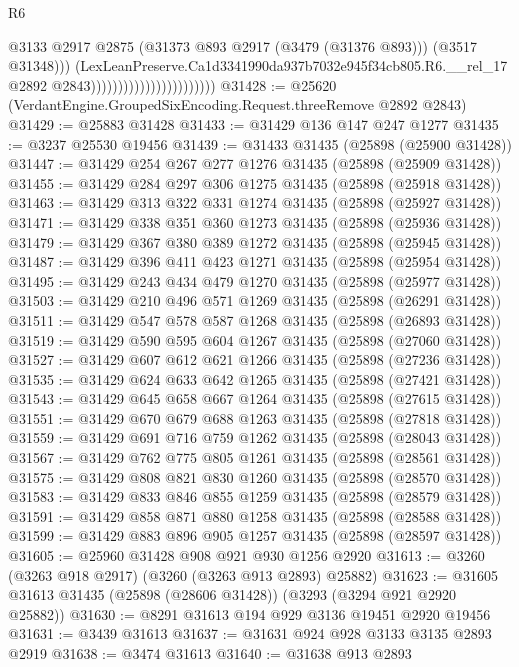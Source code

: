 \begin{lexlean}{R6}
\begin{coremodule}
                                                    @3133
                                                    @2917
                                                    @2875
                                                    (@31373 @893 @2917 (@3479 (@31376 @893)))
                                                    (@3517 @31348)))
                                                (LexLeanPreserve.Ca1d3341990da937b7032e945f34cb805.R6.__rel_17
                                                  @2892
                                                  @2843)))))))))))))))))))))))
@31428 := @25620 (VerdantEngine.GroupedSixEncoding.Request.threeRemove @2892 @2843)
@31429 := @25883 @31428
@31433 := @31429 @136 @147 @247 @1277
@31435 := @3237 @25530 @19456
@31439 := @31433 @31435 (@25898 (@25900 @31428))
@31447 := @31429 @254 @267 @277 @1276 @31435 (@25898 (@25909 @31428))
@31455 := @31429 @284 @297 @306 @1275 @31435 (@25898 (@25918 @31428))
@31463 := @31429 @313 @322 @331 @1274 @31435 (@25898 (@25927 @31428))
@31471 := @31429 @338 @351 @360 @1273 @31435 (@25898 (@25936 @31428))
@31479 := @31429 @367 @380 @389 @1272 @31435 (@25898 (@25945 @31428))
@31487 := @31429 @396 @411 @423 @1271 @31435 (@25898 (@25954 @31428))
@31495 := @31429 @243 @434 @479 @1270 @31435 (@25898 (@25977 @31428))
@31503 := @31429 @210 @496 @571 @1269 @31435 (@25898 (@26291 @31428))
@31511 := @31429 @547 @578 @587 @1268 @31435 (@25898 (@26893 @31428))
@31519 := @31429 @590 @595 @604 @1267 @31435 (@25898 (@27060 @31428))
@31527 := @31429 @607 @612 @621 @1266 @31435 (@25898 (@27236 @31428))
@31535 := @31429 @624 @633 @642 @1265 @31435 (@25898 (@27421 @31428))
@31543 := @31429 @645 @658 @667 @1264 @31435 (@25898 (@27615 @31428))
@31551 := @31429 @670 @679 @688 @1263 @31435 (@25898 (@27818 @31428))
@31559 := @31429 @691 @716 @759 @1262 @31435 (@25898 (@28043 @31428))
@31567 := @31429 @762 @775 @805 @1261 @31435 (@25898 (@28561 @31428))
@31575 := @31429 @808 @821 @830 @1260 @31435 (@25898 (@28570 @31428))
@31583 := @31429 @833 @846 @855 @1259 @31435 (@25898 (@28579 @31428))
@31591 := @31429 @858 @871 @880 @1258 @31435 (@25898 (@28588 @31428))
@31599 := @31429 @883 @896 @905 @1257 @31435 (@25898 (@28597 @31428))
@31605 := @25960 @31428 @908 @921 @930 @1256 @2920
@31613 := @3260 (@3263 @918 @2917) (@3260 (@3263 @913 @2893) @25882)
@31623 := @31605 @31613 @31435 (@25898 (@28606 @31428)) (@3293 (@3294 @921 @2920 @25882))
@31630 := @8291 @31613 @194 @929 @3136 @19451 @2920 @19456
@31631 := @3439 @31613
@31637 := @31631 @924 @928 @3133 @3135 @2893 @2919
@31638 := @3474 @31613
@31640 := @31638 @913 @2893

\end{coremodule}
\end{lexlean}
